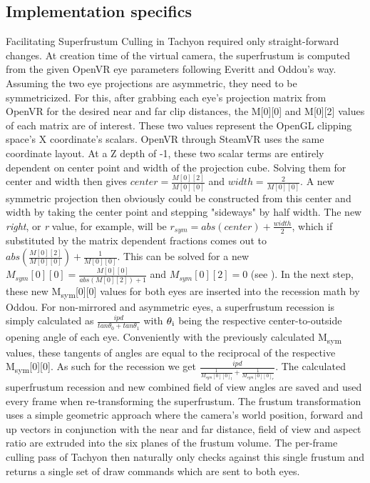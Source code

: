 \subsection{Implementation specifics}
Facilitating Superfrustum Culling in \gls{Tachyon} required only straight-forward changes. At creation time of the virtual camera, the superfrustum is computed from the given OpenVR eye parameters following Everitt and Oddou's way. 
Assuming the two eye projections are asymmetric, they need to be symmetricized. For this, after grabbing each eye's projection matrix from OpenVR for the desired near and far clip distances, the M[0][0] and M[0][2] values of each matrix are of interest. These two values represent the OpenGL clipping space's X coordinate's scalars. OpenVR through SteamVR uses the same coordinate layout. At a Z depth of -1, these two scalar terms are entirely dependent on center point and width of the projection cube. Solving them for center and width then gives $center = \frac{M[0][2]}{M[0][0]}$ and $width = \frac{2}{M[0][0]}$. 
A new symmetric projection then obviously could be constructed from this center and width by taking the center point and stepping "sideways" by half width. The new \textit{right}, or \textit{r} value, for example, will be $\textit{r}_{sym} = abs(center) + \frac{width}{2}$, which if substituted by the matrix dependent fractions comes out to $abs(\frac{M[0][2]}{M[0][0]}) + \frac{1}{M[0][0]}$. This can be solved for a new $M_{sym}[0][0] = \frac{M[0][0]}{abs(M[0][2])+1}$ and $M_{sym}[0][2] = 0$ (see \cite{Everitt.2015b}).
In the next step, these new M\textsubscript{sym}[0][0] values for both eyes are inserted into the recession math by Oddou\cite{Oddou.23.05.2017}. For non-mirrored and asymmetric eyes, a superfrustum recession is simply calculated as $\frac{ipd}{tan\theta _{0} + tan\theta _{1}}$ with $\theta \textsubscript{i}$ being the respective center-to-outside opening angle of each eye. Conveniently with the previously calculated M\textsubscript{sym} values, these tangents of angles are equal to the reciprocal of the respective M\textsubscript{sym}[0][0]. As such for the recession we get $\frac{ipd}{\frac{1}{M_{sym}[0][0]_{l}}+\frac{1}{M_{sym}[0][0]_{r}}}$. 
The calculated superfrustum recession and new combined field of view angles are saved and used every frame when re-transforming the superfrustum. The frustum transformation uses a simple geometric approach where the camera's world position, forward and up vectors in conjunction with the near and far distance, field of view and aspect ratio are extruded into the six planes of the frustum volume. 
The per-frame culling pass of \gls{Tachyon} then naturally only checks against this single frustum and returns a single set of draw commands which are sent to both eyes. 

